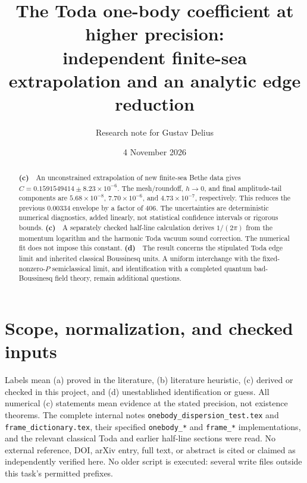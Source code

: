 \documentclass[11pt,a4paper]{article}
\title{The Toda one-body coefficient at higher precision:\\
independent finite-sea extrapolation and an analytic edge reduction}
\author{Research note for Gustav Delius}
\date{4 November 2026}
\newcommand{\Lc}{\textbf{(c)}\ }
\newcommand{\Ld}{\textbf{(d)}\ }
\begin{document}
\maketitle
\begin{abstract}
\Lc\ An unconstrained extrapolation of new finite-sea Bethe data gives
$C=0.1591549414\pm 8.23\times10^{-6}$.
The mesh/roundoff, $h\to0$, and final amplitude-tail components are $5.68\times10^{-8}$, $7.70\times10^{-6}$, and $4.73\times10^{-7}$, respectively. This reduces the previous $0.00334$ envelope by a factor of 406.
The uncertainties are deterministic numerical diagnostics, added linearly,
not statistical confidence intervals or rigorous bounds.
\Lc\ A separately checked half-line calculation derives $1/(2\pi)$ from
the momentum logarithm and the harmonic Toda vacuum sound correction.
The numerical fit does not impose this constant.
\Ld\ The result concerns the stipulated Toda edge limit and inherited
classical Boussinesq units. A uniform interchange with the fixed-nonzero-$P$
semiclassical limit, and identification with a completed quantum bad-Boussinesq
field theory, remain additional questions.
\end{abstract}

\section{Scope, normalization, and checked inputs}
Labels mean (a) proved in the literature, (b) literature heuristic,
(c) derived or checked in this project, and (d) unestablished identification
or guess. All numerical (c) statements mean evidence at the stated precision,
not existence theorems. The complete internal notes
\texttt{onebody\_dispersion\_test.tex} and \texttt{frame\_dictionary.tex},
their specified \texttt{onebody\_*} and \texttt{frame\_*} implementations,
and the relevant classical Toda and earlier half-line sections were read.
No external reference, DOI, arXiv entry, full text, or abstract is cited or
claimed as independently verified here. No older script is executed: several
write files outside this task's permitted prefixes.
\end{document}
